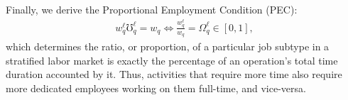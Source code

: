 \documentclass[hidelinks, nonatbib]{elsarticle}
\begin{document}
\begin{enumerate}
\begin{enumerate}
        Finally, we derive the Proportional Employment Condition (PEC):
        \begin{gather}
            w_{q}^{\ell}
            \mho_{q}^{\ell}
            =
            w_q
            \iff
            \frac{
                w_{q}^{\ell}
            }{
                w_q
            }
            =
            \Omega_{q}^{\ell}
            \in [0,1]
            ,
        \end{gather}
        which determines the ratio, or proportion, of a particular job subtype in a stratified labor market is exactly the percentage of an operation's total time duration accounted by it. Thus, activities that require more time also require more dedicated employees working on them full-time, and vice-versa.
    \end{enumerate}
\end{enumerate}

\end{document}
